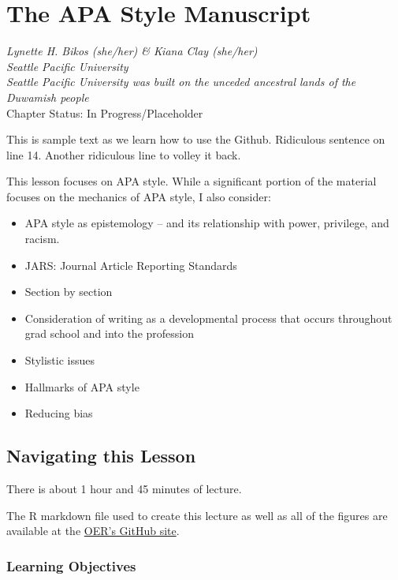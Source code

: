 \documentclass[
  11pt,
]{book}
\providecommand{\tightlist}{%
  \setlength{\itemsep}{0pt}\setlength{\parskip}{0pt}}
\begin{document}
\hypertarget{APAstyle}{%
\chapter{The APA Style Manuscript}\label{APAstyle}}

\emph{Lynette H. Bikos (she/her) \& Kiana Clay (she/her)}\\
\emph{Seattle Pacific University}\\
\emph{Seattle Pacific University was built on the unceded ancestral lands of the Duwamish people}\\
Chapter Status: In Progress/Placeholder

This is sample text as we learn how to use the Github.
Ridiculous sentence on line 14. Another ridiculous line to volley it back.

This lesson focuses on APA style. While a significant portion of the material focuses on the mechanics of APA style, I also consider:

\begin{itemize}
\tightlist
\item
  APA style as epistemology -- and its relationship with power, privilege, and racism.
\item
  JARS: Journal Article Reporting Standards
\item
  Section by section
\item
  Consideration of writing as a developmental process that occurs throughout grad school and into the profession
\item
  Stylistic issues
\item
  Hallmarks of APA style
\item
  Reducing bias
\end{itemize}

\hypertarget{navigating-this-lesson}{%
\section{Navigating this Lesson}\label{navigating-this-lesson}}

There is about 1 hour and 45 minutes of lecture.

The R markdown file used to create this lecture as well as all of the figures are available at the \href{https://github.com/lhbikos/ReC_Topics}{OER's GitHub site}.

\hypertarget{learning-objectives-1}{%
\subsection{Learning Objectives}\label{learning-objectives-1}}
\end{document}
